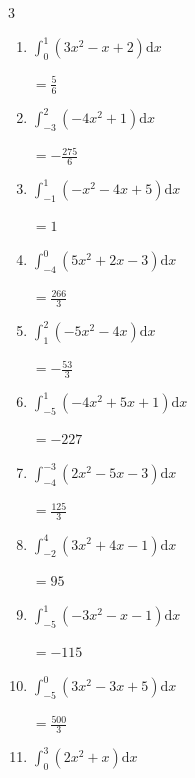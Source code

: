 \begin{multicols}{3}
\begin{enumerate}
  \item $\displaystyle \int_{0}^{1}\left( 3x^{2}-x+2 \right) \mathrm{d}x$

        $\displaystyle =\frac{5}{6}$

  \item $\displaystyle \int_{-3}^{2}\left( -4x^{2}+1 \right) \mathrm{d}x$

        $\displaystyle =-\frac{275}{6}$

  \item $\displaystyle \int_{-1}^{1}\left( -x^{2}-4x+5 \right) \mathrm{d}x$

        $\displaystyle =1$

\columnbreak %

  \item $\displaystyle \int_{-4}^{0}\left( 5x^{2}+2x-3 \right) \mathrm{d}x$

        $\displaystyle =\frac{266}{3}$

  \item $\displaystyle \int_{1}^{2}\left( -5x^{2}-4x \right) \mathrm{d}x$

        $\displaystyle =-\frac{53}{3}$

  \item $\displaystyle \int_{-5}^{1}\left( -4x^{2}+5x+1 \right) \mathrm{d}x$

        $\displaystyle =-227$

  \item $\displaystyle \int_{-4}^{-3}\left( 2x^{2}-5x-3 \right) \mathrm{d}x$

        $\displaystyle =\frac{125}{3}$

  \item $\displaystyle \int_{-2}^{4}\left( 3x^{2}+4x-1 \right) \mathrm{d}x$

        $\displaystyle =95$

\columnbreak %

\resetques

  \item $\displaystyle \int_{-5}^{1}\left( -3x^{2}-x-1 \right) \mathrm{d}x$

        $\displaystyle =-115$

  \item $\displaystyle \int_{-5}^{0}\left( 3x^{2}-3x+5 \right) \mathrm{d}x$

        $\displaystyle =\frac{500}{3}$

  \item $\displaystyle \int_{0}^{3}\left( 2x^{2}+x \right) \mathrm{d}x$


\end{enumerate}
\end{multicols}
